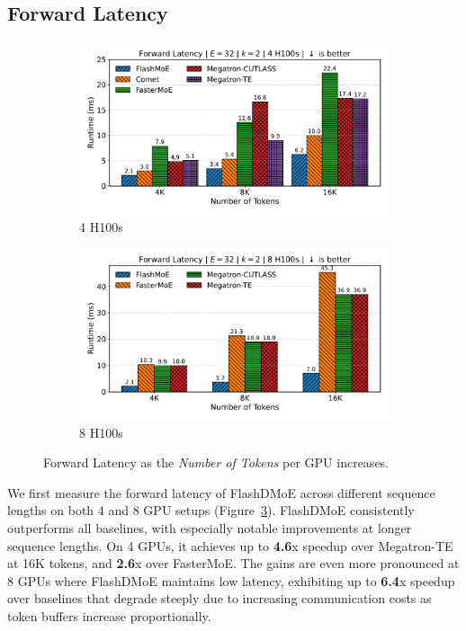 \subsection{Forward Latency}\label{subsec:forward-latency}
\begin{figure}[!h]
    \centering
    \begin{subfigure}{0.49\textwidth}
        \centering
        \includegraphics[width=\linewidth, keepaspectratio]{flash_figs/scaling_tokens}
        \caption{4 H100s}
        \label{sub:4gl}
    \end{subfigure}
    \begin{subfigure}{0.49\textwidth}
        \centering
        \includegraphics[width=\linewidth, keepaspectratio]{flash_figs/scaling_tokens_8}
        \caption{8 H100s}
        \label{sub:8gl}
    \end{subfigure}
    \caption{Forward Latency as the \emph{Number of Tokens} per GPU increases.}
    \label{fig:fl}
\end{figure}
We first measure the forward latency of FlashDMoE across different sequence lengths on both 4 and 8 GPU setups
(Figure~\ref{fig:fl}).
FlashDMoE consistently outperforms all baselines,
with especially notable improvements at longer sequence lengths.
On 4 GPUs, it achieves up to \textbf{4.6}x speedup over Megatron-TE at 16K tokens,
and \textbf{2.6}x over FasterMoE.
The gains are even more pronounced at 8 GPUs
where FlashDMoE maintains low latency, exhibiting up to \textbf{6.4}x speedup over baselines that
degrade steeply due to increasing communication costs as token buffers increase proportionally.
